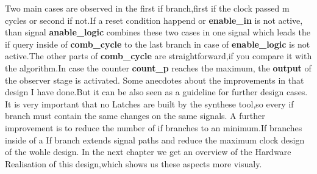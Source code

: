Two main cases are observed in the first if branch,first if the clock passed m cycles or second if not.If a reset condition happend or \textbf{enable\_in}
is not active, than signal \textbf{anable\_logic} combines these two cases in one signal which leads the if query inside of \textbf{comb\_cycle} to the last branch in case of \textbf{enable\_logic}
is not active.The other parts of \textbf{comb\_cycle} are straightforward,if you compare it with the algorithm.In case the counter \textbf{count\_p} reaches the maximum,
the  \textbf{output} of the observer stage is activated.\newline
Some anecdotes about the improvements in that design I have done.But it can be also seen as a guideline for further design cases.
It is very important that no Latches are built by the synthese tool,so every if branch must contain the same changes on the same signals.
A further improvement is to reduce the number of if branches to an minimum.If branches inside of a If branch extends signal paths and reduce the maximum clock design of the wohle design.
In the next chapter we get an overview of the Hardware Realisation of this design,which shows us these aspects more visualy.
